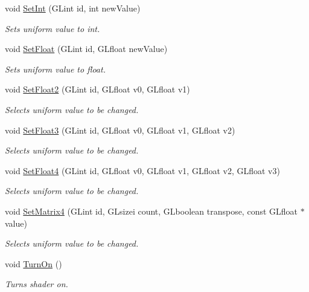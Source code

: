 \begin{CompactItemize}
void \hyperlink{class_shader_3287589cdac47466a201e2d6702280ee}{SetInt} (GLint id, int newValue)
\begin{CompactList}\small\item\em Sets uniform value to int. \item\end{CompactList}\item 
void \hyperlink{class_shader_df02f121177b2723321441701361fab4}{SetFloat} (GLint id, GLfloat newValue)
\begin{CompactList}\small\item\em Sets uniform value to float. \item\end{CompactList}\item 
void \hyperlink{class_shader_8c50bc3b65790489f1538867face7b81}{SetFloat2} (GLint id, GLfloat v0, GLfloat v1)
\begin{CompactList}\small\item\em Selects uniform value to be changed. \item\end{CompactList}\item 
void \hyperlink{class_shader_439aaf809ad7287862907ab1a36f3849}{SetFloat3} (GLint id, GLfloat v0, GLfloat v1, GLfloat v2)
\begin{CompactList}\small\item\em Selects uniform value to be changed. \item\end{CompactList}\item 
void \hyperlink{class_shader_4be6e8b9886f58bc5615d2f736c8885c}{SetFloat4} (GLint id, GLfloat v0, GLfloat v1, GLfloat v2, GLfloat v3)
\begin{CompactList}\small\item\em Selects uniform value to be changed. \item\end{CompactList}\item 
void \hyperlink{class_shader_61b49dc75fb1842ec58845e9912f824d}{SetMatrix4} (GLint id, GLsizei count, GLboolean transpose, const GLfloat $\ast$value)
\begin{CompactList}\small\item\em Selects uniform value to be changed. \item\end{CompactList}\item 
void \hyperlink{class_shader_01e9b0696a56a5c567ea4b369872c982}{TurnOn} ()
\begin{CompactList}\small\item\em Turns shader on. \item\end{CompactList}\item 

\end{CompactItemize}
